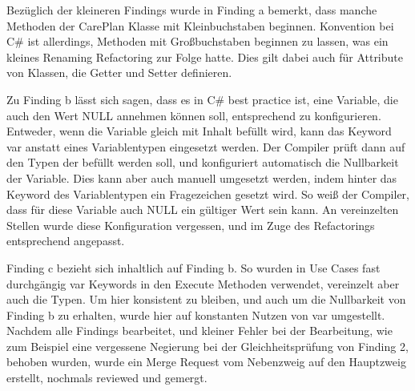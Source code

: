 Bezüglich der kleineren Findings wurde in Finding a bemerkt, dass manche Methoden der CarePlan Klasse mit Kleinbuchstaben beginnen. Konvention bei C\# ist allerdings, Methoden mit Großbuchstaben beginnen zu lassen, was ein kleines Renaming Refactoring zur Folge hatte. Dies gilt dabei auch für Attribute von Klassen, die Getter und Setter definieren.
\par
Zu Finding b lässt sich sagen, dass es in C\# best practice ist, eine Variable, die auch den Wert NULL annehmen können soll, entsprechend zu konfigurieren. Entweder, wenn die Variable gleich mit Inhalt befüllt wird, kann das Keyword var anstatt eines Variablentypen eingesetzt werden. Der Compiler prüft dann auf den Typen der befüllt werden soll, und konfiguriert automatisch die Nullbarkeit der Variable. Dies kann aber auch manuell umgesetzt werden, indem hinter das Keyword des Variablentypen ein Fragezeichen gesetzt wird. So weiß der Compiler, dass für diese Variable auch NULL ein gültiger Wert sein kann.
An vereinzelten Stellen wurde diese Konfiguration vergessen, und im Zuge des Refactorings entsprechend angepasst.
\par
Finding c bezieht sich inhaltlich auf Finding b. So wurden in Use Cases fast durchgängig var Keywords in den Execute Methoden verwendet, vereinzelt aber auch die Typen. Um hier konsistent zu bleiben, und auch um die Nullbarkeit von Finding b zu erhalten, wurde hier auf konstanten Nutzen von var umgestellt.
Nachdem alle Findings bearbeitet, und kleiner Fehler bei der Bearbeitung, wie zum Beispiel eine vergessene Negierung bei der Gleichheitsprüfung von Finding 2, behoben wurden, wurde ein Merge Request vom Nebenzweig auf den Hauptzweig erstellt, nochmals reviewed und gemergt.

 

